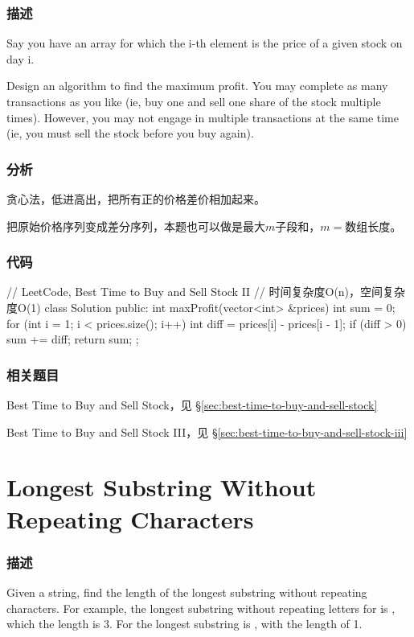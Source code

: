 \subsubsection{描述}
Say you have an array for which the i-th element is the price of a given stock on day i.

Design an algorithm to find the maximum profit. You may complete as many transactions as you like (ie, buy one and sell one share of the stock multiple times). However, you may not engage in multiple transactions at the same time (ie, you must sell the stock before you buy again).


\subsubsection{分析}
贪心法，低进高出，把所有正的价格差价相加起来。

把原始价格序列变成差分序列，本题也可以做是最大$m$子段和，$m=$数组长度。

\subsubsection{代码}
\begin{Code}
// LeetCode, Best Time to Buy and Sell Stock II
// 时间复杂度O(n)，空间复杂度O(1)
class Solution {
public:
    int maxProfit(vector<int> &prices) {
        int sum = 0;
        for (int i = 1; i < prices.size(); i++) {
            int diff = prices[i] - prices[i - 1];
            if (diff > 0) sum += diff;
        }
        return sum;
    }
};
\end{Code}


\subsubsection{相关题目}
\begindot
\item Best Time to Buy and Sell Stock，见 \S \ref{sec:best-time-to-buy-and-sell-stock}
\item Best Time to Buy and Sell Stock III，见 \S \ref{sec:best-time-to-buy-and-sell-stock-iii}
\myenddot


\section{Longest Substring Without Repeating Characters} %
\label{sec:longest-substring-without-repeating-characters}


\subsubsection{描述}
Given a string, find the length of the longest substring without repeating characters. For example, the longest substring without repeating letters for  is , which the length is 3. For  the longest substring is , with the length of 1.


